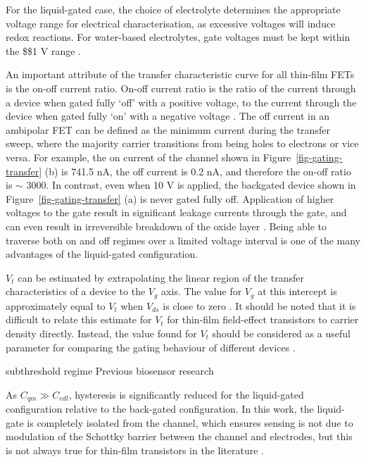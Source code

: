 \documentclass[
  a4paper,
]{scrbook}
\begin{document}
For the liquid-gated case, the choice of electrolyte determines the
appropriate voltage range for electrical characterisation, as excessive
voltages will induce redox reactions. For water-based electrolytes, gate
voltages must be kept within the \$\pm\$1 V range
\autocite{Shkodra2021}.

An important attribute of the transfer characteristic curve for all
thin-film FETs is the on-off current ratio. On-off current ratio is the
ratio of the current through a device when gated fully `off' with a
positive voltage, to the current through the device when gated fully
`on' with a negative voltage \autocite{Zheng2017}. The off current in an
ambipolar FET can be defined as the minimum current during the transfer
sweep, where the majority carrier transitions from being holes to
electrons or vice versa. For example, the on current of the channel
shown in Figure~\ref{fig-gating-transfer} (b) is 741.5 nA, the off
current is 0.2 nA, and therefore the on-off ratio is \(\sim\) 3000. In
contrast, even when 10 V is applied, the backgated device shown in
Figure~\ref{fig-gating-transfer} (a) is never gated fully off.
Application of higher voltages to the gate result in significant leakage
currents through the gate, and can even result in irreversible breakdown
of the oxide layer \autocite{Sze2006}. Being able to traverse both on
and off regimes over a limited voltage interval is one of the many
advantages of the liquid-gated configuration.

\(V_t\) can be estimated by extrapolating the linear region of the
transfer characteristics of a device to the \(V_g\) axis. The value for
\(V_g\) at this intercept is approximately equal to \(V_t\) when
\(V_{ds}\) is close to zero \autocite{Sze2006}. It should be noted that
it is difficult to relate this estimate for \(V_t\) for thin-film
field-effect transistors to carrier density directly. Instead, the value
found for \(V_t\) should be considered as a useful parameter for
comparing the gating behaviour of different devices
\autocite{Schoonveld2001}.

subthreshold regime Previous biosensor research

As \(C_{qm} \gg C_{edl}\), hysteresis is significantly reduced for the
liquid-gated configuration relative to the back-gated configuration. In
this work, the liquid-gate is completely isolated from the channel,
which ensures sensing is not due to modulation of the Schottky barrier
between the channel and electrodes, but this is not always true for
thin-film transistors in the literature \autocite{Li2023}.
\end{document}
